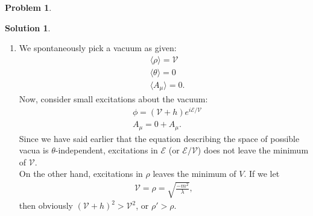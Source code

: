 \documentclass{book}
\numberwithin{equation}{section}
\theoremstyle{definition}
\newtheorem{prob}{Problem}[section]
\newtheorem{sln}{Solution}[section]
\newcommand{\E}{\mathcal{E}}
\newcommand{\V}{\mathcal{V}}
\begin{document}
\begin{prob}
\begin{sln}
\begin{enumerate}
				
				
				
				
				
				
				
				
				
				
				
				\item We spontaneously pick a vacuum as given:
				\begin{align}
				&\langle \rho \rangle = \V\\
				&\langle \theta \rangle  = 0\\
				&\langle A_\mu \rangle = 0.
				\end{align}
				Now, consider small excitations about the vacuum:
				\begin{align}
				&\phi = (\V+h)e^{i\E/\V}\\
				&A_\mu = 0 + A_\mu.
				\end{align}
				Since we have said earlier that the equation describing the space of possible vacua is $\theta$-independent, excitations in $\E$ (or $\E/\V$) does not leave the minimum of $\V$.\\
				
				On the other hand, excitations in $\rho$ leaves the minimum of $V$. If we let
				\begin{align}
				\V = \rho = \sqrt{\frac{-m^2}{\lambda}},
				\end{align}
				then obviously $(\V+h)^2 > \V^2$, or $\rho' > \rho$.\\
				
				
				
				
				
				
				
				
				
				
				
				
				
				
				

\end{enumerate}
\end{sln}
\end{prob}
\end{document}
